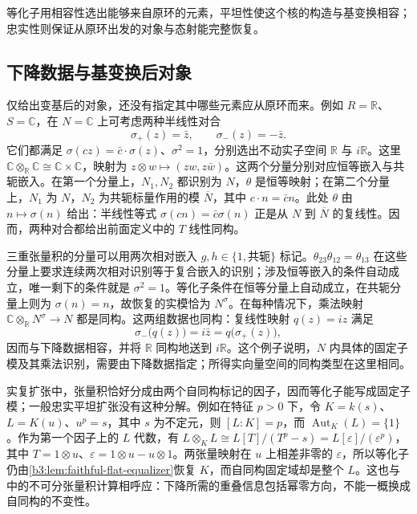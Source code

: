 等化子用相容性选出能够来自原环的元素，平坦性使这个核的构造与基变换相容；忠实性则保证从原环出发的对象与态射能完整恢复。

\subsection{下降数据与基变换后对象}
\label{b3:subsec:1206:03}

仅给出变基后的对象，还没有指定其中哪些元素应从原环而来。例如 \(R=\mathbb R\)、\(S=\mathbb C\)，在 \(N=\mathbb C\) 上可考虑两种半线性对合
\[
	\sigma_+(z)=\bar z,\qquad \sigma_-(z)=-\bar z.
\]
它们都满足 \(\sigma(cz)=\bar c\cdot\sigma(z)\)、\(\sigma^2=1\)，分别选出不动实子空间 \(\mathbb R\) 与 \(i\mathbb R\)。这里 \(\mathbb C\otimes_{\mathbb R}\mathbb C\cong\mathbb C\times\mathbb C\)，映射为 \(z\otimes w\mapsto(zw,z\bar w)\)。这两个分量分别对应恒等嵌入与共轭嵌入。在第一个分量上，\(N_1,N_2\) 都识别为 \(N\)，\(\theta\) 是恒等映射；在第二个分量上，\(N_1\) 为 \(N\)，\(N_2\) 为共轭标量作用的模 \(\overline N\)，其中 \(c\cdot n=\bar c n\)。此处 \(\theta\) 由 \(n\mapsto\sigma(n)\) 给出：半线性等式 \(\sigma(cn)=\bar c\sigma(n)\) 正是从 \(N\) 到 \(\overline N\) 的复线性。因而，两种对合都给出前面定义中的 \(T\) 线性同构。

\ProseParagraphBreak
三重张量积的分量可以用两次相对嵌入 \(g,h\in\{1,\text{共轭}\}\) 标记。\(\theta_{23}\theta_{12}=\theta_{13}\) 在这些分量上要求连续两次相对识别等于复合嵌入的识别；涉及恒等嵌入的条件自动成立，唯一剩下的条件就是 \(\sigma^2=1\)。等化子条件在恒等分量上自动成立，在共轭分量上则为 \(\sigma(n)=n\)，故恢复的实模恰为 \(N^\sigma\)。在每种情况下，乘法映射 \(\mathbb C\otimes_{\mathbb R}N^\sigma\to N\) 都是同构。这两组数据也同构：复线性映射 \(q(z)=iz\) 满足
\[
	\sigma_-\bigl(q(z)\bigr)=i\bar z=q\bigl(\sigma_+(z)\bigr),
\]
因而与下降数据相容，并将 \(\mathbb R\) 同构地送到 \(i\mathbb R\)。这个例子说明，\(N\) 内具体的固定子模及其乘法识别，需要由下降数据指定；所得实向量空间的同构类型在这里相同。

\ProseParagraphBreak
实复扩张中，张量积恰好分成由两个自同构标记的因子，因而等化子能写成固定子模；一般忠实平坦扩张没有这种分解。例如在特征 \(p>0\) 下，令 \(K=k(s)\)、\(L=K(u)\)、\(u^p=s\)，其中 \(s\) 为不定元，则 \([L:K]=p\)，而 \(\operatorname{Aut}_K(L)=\{1\}\)。作为第一个因子上的 \(L\) 代数，有 \(L\otimes_KL\cong L[T]/(T^p-s)=L[\varepsilon]/(\varepsilon^p)\)，其中 \(T=1\otimes u\)、\(\varepsilon=1\otimes u-u\otimes1\)。两张量映射在 \(u\) 上相差非零的 \(\varepsilon\)，所以等化子仍由\cref{b3:lem:faithful-flat-equalizer}恢复 \(K\)，而自同构固定域却是整个 \(L\)。这也与中的不可分张量积计算相呼应：下降所需的重叠信息包括幂零方向，不能一概换成自同构的不变性。

